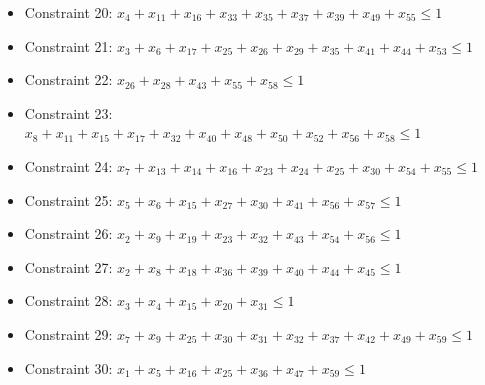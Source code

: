 \documentclass[11pt]{article}
\begin{document}
\begin{itemize}
\item Constraint 20: $x_{4} + x_{11} + x_{16} + x_{33} + x_{35} + x_{37} + x_{39} + x_{49} + x_{55} \le 1$
\item Constraint 21: $x_{3} + x_{6} + x_{17} + x_{25} + x_{26} + x_{29} + x_{35} + x_{41} + x_{44} + x_{53} \le 1$
\item Constraint 22: $x_{26} + x_{28} + x_{43} + x_{55} + x_{58} \le 1$
\item Constraint 23: $x_{8} + x_{11} + x_{15} + x_{17} + x_{32} + x_{40} + x_{48} + x_{50} + x_{52} + x_{56} + x_{58} \le 1$
\item Constraint 24: $x_{7} + x_{13} + x_{14} + x_{16} + x_{23} + x_{24} + x_{25} + x_{30} + x_{54} + x_{55} \le 1$
\item Constraint 25: $x_{5} + x_{6} + x_{15} + x_{27} + x_{30} + x_{41} + x_{56} + x_{57} \le 1$
\item Constraint 26: $x_{2} + x_{9} + x_{19} + x_{23} + x_{32} + x_{43} + x_{54} + x_{56} \le 1$
\item Constraint 27: $x_{2} + x_{8} + x_{18} + x_{36} + x_{39} + x_{40} + x_{44} + x_{45} \le 1$
\item Constraint 28: $x_{3} + x_{4} + x_{15} + x_{20} + x_{31} \le 1$
\item Constraint 29: $x_{7} + x_{9} + x_{25} + x_{30} + x_{31} + x_{32} + x_{37} + x_{42} + x_{49} + x_{59} \le 1$
\item Constraint 30: $x_{1} + x_{5} + x_{16} + x_{25} + x_{36} + x_{47} + x_{59} \le 1$
\end{itemize}
\end{document}
